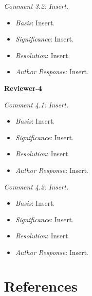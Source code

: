 \documentclass[
]{book}
\providecommand{\tightlist}{%
  \setlength{\itemsep}{0pt}\setlength{\parskip}{0pt}}
\begin{document}
\emph{Comment 3.2: Insert.}

\begin{itemize}
\tightlist
\item
  \emph{Basis}: Insert.\\
\item
  \emph{Significance}: Insert.\\
\item
  \emph{Resolution}: Insert.\\
\item
  \emph{Author Response}: Insert.
\end{itemize}

\textbf{Reviewer-4}

\emph{Comment 4.1: Insert.}

\begin{itemize}
\tightlist
\item
  \emph{Basis}: Insert.\\
\item
  \emph{Significance}: Insert.\\
\item
  \emph{Resolution}: Insert.\\
\item
  \emph{Author Response}: Insert.
\end{itemize}

\emph{Comment 4.2: Insert.}

\begin{itemize}
\tightlist
\item
  \emph{Basis}: Insert.\\
\item
  \emph{Significance}: Insert.\\
\item
  \emph{Resolution}: Insert.\\
\item
  \emph{Author Response}: Insert.
\end{itemize}

\hypertarget{references}{%
\chapter{References}\label{references}}

  
\end{document}
